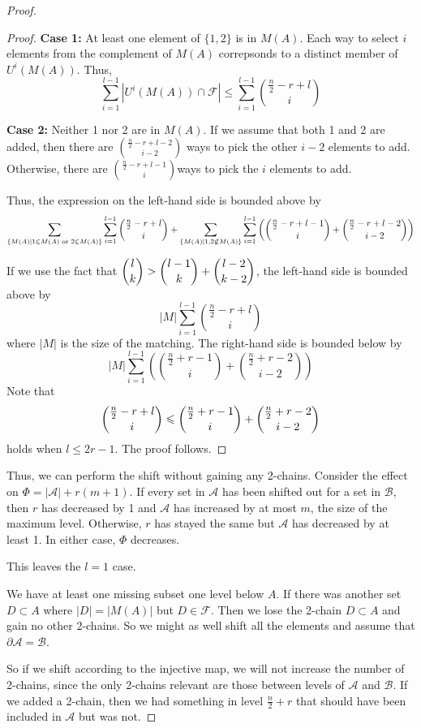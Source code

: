 \documentclass[12pt]{article}
\theoremstyle{plain}
\theoremstyle{definition}
\theoremstyle{remark}
\newcommand{\F}{\mathcal{F}}
\newcommand{\A}{\mathcal{A}}
\newcommand{\B}{\mathcal{B}}
\begin{document}
\begin{proof}
\begin{proof}
\textbf{Case 1:} At least one element of $\{1,2\}$ is in $M(A)$. Each way to select $i$ elements from the complement of $M(A)$ correpsonds to a distinct member of $U^i(M(A))$. Thus,
\[ \sum_{i = 1}^{l-1} |U^i(M(A)) \cap \F| \leq \sum_{i=1}^{l-1}\binom{\frac{n}{2}-r+l}{i}\]

\textbf{Case 2:} Neither 1 nor 2 are in $M(A)$. If we assume that both 1 and 2 are added, then there are $\binom{\frac{n}{2}-r + l - 2}{i -2}$ ways to pick the other $i - 2$ elements to add. Otherwise, there are $\binom{\frac{n}{2} - r + l - 1}{i}$ways to pick the $i$ elements to add.

Thus, the expression on the left-hand side is bounded above by
\[ \sum_{\{M(A) | 1 \in M(A) \text{ or } 2 \in M(A)\}} \sum_{i=1}^{l-1} \dbinom{\frac{n}{2}-r+l}{i} + \sum_{\{M(A) | 1, 2 \not\in M(A)\}} \sum_{i=1}^{l-1} \left( \dbinom{\frac{n}{2}-r+l-1}{i} + \dbinom{\frac{n}{2}-r+l-2}{i-2} \right) \]

If we use the fact that $\dbinom{l}{k} > \dbinom{l-1}{k} + \dbinom{l-2}{k-2}$, the left-hand side is bounded above by
\[ |M|\sum_{i=1}^{l-1} \binom{\frac{n}{2}-r+l}{i}\]
where $|M|$ is the size of the matching.
The right-hand side is bounded below by
\[ |M| \sum_{i=1}^{l-1}\left(\binom{\frac{n}{2} + r - 1}{i} + \binom{\frac{n}{2}+r-2}{i-2}\right)\]
Note that
\[ \dbinom{\frac{n}{2}-r+l}{i} \leq \dbinom{\frac{n}{2}+r-1}{i} + \dbinom{\frac{n}{2}+r-2}{i-2} \]
holds when $l \leq 2r-1$. The proof follows.
\end{proof}

Thus, we can perform the shift without gaining any 2-chains. Consider the effect on $\Phi = |\A| + r(m+1)$. If every set in $\A$ has been shifted out for a set in $\B$, then $r$ has decreased by 1 and $\A$ has increased by at most $m$, the size of the maximum level. Otherwise, $r$ has stayed the same but $\A$ has decreased by at least 1. In either case, $\Phi$ decreases.

This leaves the $l = 1$ case. 


We have at least one missing subset one level below $A$. If there was another set $D \subset A$ where $|D| = |M(A)|$ but $D \in \F$. Then we lose the 2-chain $D \subset A$ and gain no other 2-chains. So we might as well shift all the elements and assume that $\partial \A = \B$. 

So if we shift according to the injective map, we will not increase the number of 2-chains, since the only 2-chains relevant are those between levels of $\A$ and $\B$. If we added a 2-chain, then we had something in level $\frac{n}{2} + r$ that should have been included in $\A$ but was not.


\end{proof}
\end{document}
